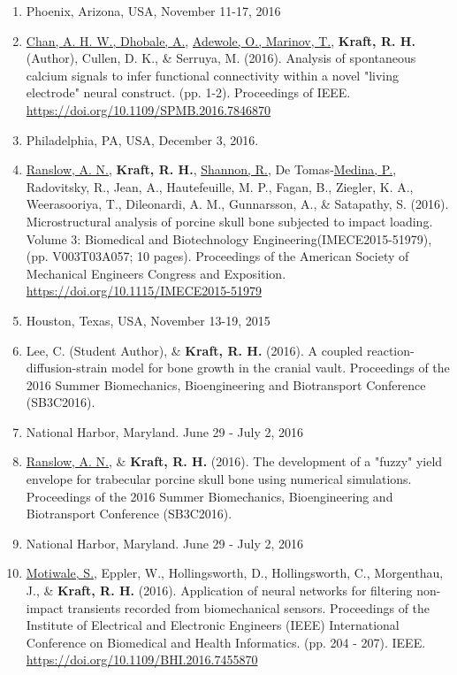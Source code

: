 \documentclass[a4paper,10pt]{article}
\begin{document}
\begin{enumerate}
  \item Phoenix, Arizona, USA, November 11-17, 2016
  \item \underline{Chan, A. H. W., Dhobale, A.}, \underline{Adewole, O., Marinov, T.}, \textbf{\textbf{Kraft,} R. H.} (Author), Cullen, D. K., \&
 Serruya, M. (2016). Analysis of spontaneous calcium signals to infer functional connectivity within a novel "living electrode" neural construct. (pp. 1-2). Proceedings of IEEE. \url{https://doi.org/10.1109/SPMB.2016.7846870}
  \item Philadelphia, PA, USA, December 3, 2016.
  \item \underline{Ranslow, A. N.}, \textbf{\textbf{Kraft,} R. H.}, \underline{Shannon, R.}, De Tomas-\underline{Medina, P.}, Radovitsky, R., Jean, A., Hautefeuille, M. P., Fagan, B., Ziegler, K. A., Weerasooriya, T., Dileonardi, A. M., Gunnarsson, A., \&
 Satapathy, S. (2016). Microstructural analysis of porcine skull bone subjected to impact loading. Volume 3: Biomedical and Biotechnology Engineering(IMECE2015-51979), (pp. V003T03A057; 10 pages). Proceedings of the American Society of Mechanical Engineers Congress and Exposition. \url{https://doi.org/10.1115/IMECE2015-51979}
  \item Houston, Texas, USA, November 13-19, 2015
  \item Lee, C. (Student Author), \&
 \textbf{\textbf{Kraft,} R. H.} (2016). A coupled reaction-diffusion-strain model for bone growth in the cranial vault. Proceedings of the 2016 Summer Biomechanics, Bioengineering and Biotransport Conference (SB3C2016).
  \item National Harbor, Maryland. June 29 - July 2, 2016
  \item \underline{Ranslow, A. N.}, \&
 \textbf{\textbf{Kraft,} R. H.} (2016). The development of a "fuzzy" yield envelope for trabecular porcine skull bone using numerical simulations. Proceedings of the 2016 Summer Biomechanics, Bioengineering and Biotransport Conference (SB3C2016).
  \item National Harbor, Maryland. June 29 - July 2, 2016
  \item \underline{Motiwale, S.}, Eppler, W., Hollingsworth, D., Hollingsworth, C., Morgenthau, J., \&
 \textbf{\textbf{Kraft,} R. H.} (2016). Application of neural networks for filtering non-impact transients recorded from biomechanical sensors. Proceedings of the Institute of Electrical and Electronic Engineers (IEEE) International Conference on Biomedical and Health Informatics. (pp. 204 - 207). IEEE. \url{https://doi.org/10.1109/BHI.2016.7455870}

\end{enumerate}
\end{document}
